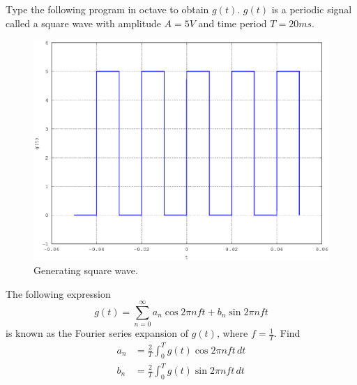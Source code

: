 
%
\begin{problem}
Type the following program in octave to obtain $g(t)$.  $g(t)$ is a periodic signal called a square wave with amplitude $A = 5V$ and time period $T=20 ms$.
\end{problem}
%
\solution

\begin{figure}[!h]
\centering

\includegraphics[width=\columnwidth]{./chapter1/figs/1.1.eps}
\caption{Generating square wave.}
\label{fig:1.1}
\end{figure}
\begin{problem}
The following expression
%
\begin{equation}
g(t) = \sum_{n=0}^{\infty}a_n\cos 2\pi n f t + b_n \sin 2 \pi n f t
\end{equation}
is known as the Fourier series expansion of $g(t)$, where $f = \frac{1}{T}$.  Find 
\begin{align}
a_n &= \frac{2}{T} \int_{0}^{T}g(t) \cos 2\pi nf t \, dt \\
b_n &= \frac{2}{T} \int_{0}^{T}g(t) \sin 2\pi nf t \, dt
\end{align}
\end{problem}
